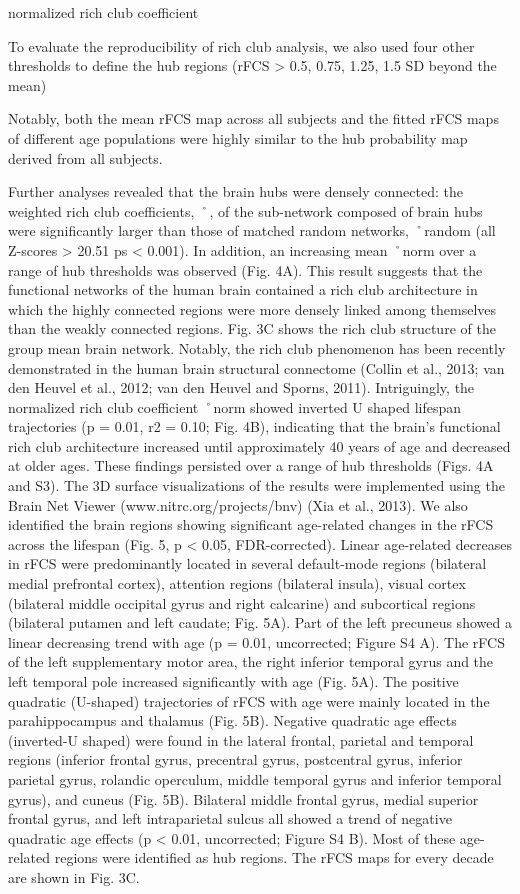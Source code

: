 normalized rich club coefficient

To evaluate the reproducibility of rich club analysis, we
also used four other thresholds to define the hub regions
(rFCS > 0.5, 0.75, 1.25, 1.5 SD beyond the mean)

Notably, both the mean rFCS map across all subjects and the fitted rFCS maps of different 
age populations were highly similar to the hub probability map derived
from all subjects.

Further analyses revealed that the brain hubs were densely
connected: the weighted rich club coefficients, ˚, of the
sub-network composed of brain hubs were significantly
larger than those of matched random networks, ˚random
(all Z-scores > 20.51 ps < 0.001). In addition, an increasing
mean ˚norm over a range of hub thresholds was observed
(Fig. 4A). This result suggests that the functional networks
of the human brain contained a rich club architecture in
which the highly connected regions were more densely
linked among themselves than the weakly connected
regions. Fig. 3C shows the rich club structure of the group
mean brain network. Notably, the rich club phenomenon
has been recently demonstrated in the human brain structural 
connectome (Collin et al., 2013; van den Heuvel et al.,
2012; van den Heuvel and Sporns, 2011). Intriguingly, the
normalized rich club coefficient ˚norm showed inverted
U shaped lifespan trajectories (p = 0.01, r2 = 0.10; Fig. 4B),
indicating that the brain’s functional rich club architecture increased 
until approximately 40 years of age and
decreased at older ages. These findings persisted over a
range of hub thresholds (Figs. 4A and S3). The 3D surface
visualizations of the results were implemented using the
Brain Net Viewer (www.nitrc.org/projects/bnv) (Xia et al.,
2013).
We also identified the brain regions showing significant
age-related changes in the rFCS across the lifespan (Fig. 5,
p < 0.05, FDR-corrected). Linear age-related decreases in
rFCS were predominantly located in several default-mode
regions (bilateral medial prefrontal cortex), attention
regions (bilateral insula), visual cortex (bilateral middle
occipital gyrus and right calcarine) and subcortical regions
(bilateral putamen and left caudate; Fig. 5A). Part of the
left precuneus showed a linear decreasing trend with age
(p = 0.01, uncorrected; Figure S4 A). The rFCS of the left supplementary 
motor area, the right inferior temporal gyrus
and the left temporal pole increased significantly with age
(Fig. 5A). The positive quadratic (U-shaped) trajectories of
rFCS with age were mainly located in the parahippocampus and 
thalamus (Fig. 5B). Negative quadratic age effects
(inverted-U shaped) were found in the lateral frontal, parietal 
and temporal regions (inferior frontal gyrus, precentral
gyrus, postcentral gyrus, inferior parietal gyrus, rolandic
operculum, middle temporal gyrus and inferior temporal
gyrus), and cuneus (Fig. 5B). Bilateral middle frontal gyrus,
medial superior frontal gyrus, and left intraparietal sulcus all 
showed a trend of negative quadratic age effects
(p < 0.01, uncorrected; Figure S4 B). Most of these age-related 
regions were identified as hub regions. The rFCS
maps for every decade are shown in Fig. 3C.

